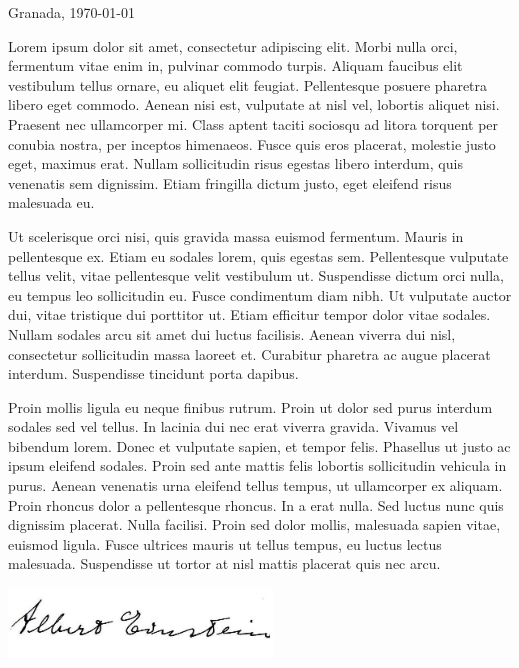 \documentclass[noDatosCabecera, noDatosPie, marcaagua, monocromo]{UGR-carta}
\begin{document}
Granada, \today
\medskip

Lorem ipsum dolor sit amet, consectetur adipiscing elit. Morbi nulla orci, fermentum vitae enim in, pulvinar commodo turpis. Aliquam faucibus elit vestibulum tellus ornare, eu aliquet elit feugiat. Pellentesque posuere pharetra libero eget commodo. Aenean nisi est, vulputate at nisl vel, lobortis aliquet nisi. Praesent nec ullamcorper mi. Class aptent taciti sociosqu ad litora torquent per conubia nostra, per inceptos himenaeos. Fusce quis eros placerat, molestie justo eget, maximus erat. Nullam sollicitudin risus egestas libero interdum, quis venenatis sem dignissim. Etiam fringilla dictum justo, eget eleifend risus malesuada eu.

Ut scelerisque orci nisi, quis gravida massa euismod fermentum. Mauris in pellentesque ex. Etiam eu sodales lorem, quis egestas sem. Pellentesque vulputate tellus velit, vitae pellentesque velit vestibulum ut. Suspendisse dictum orci nulla, eu tempus leo sollicitudin eu. Fusce condimentum diam nibh. Ut vulputate auctor dui, vitae tristique dui porttitor ut. Etiam efficitur tempor dolor vitae sodales. Nullam sodales arcu sit amet dui luctus facilisis. Aenean viverra dui nisl, consectetur sollicitudin massa laoreet et. Curabitur pharetra ac augue placerat interdum. Suspendisse tincidunt porta dapibus.

Proin mollis ligula eu neque finibus rutrum. Proin ut dolor sed purus interdum sodales sed vel tellus. In lacinia dui nec erat viverra gravida. Vivamus vel bibendum lorem. Donec et vulputate sapien, et tempor felis. Phasellus ut justo ac ipsum eleifend sodales. Proin sed ante mattis felis lobortis sollicitudin vehicula in purus. Aenean venenatis urna eleifend tellus tempus, ut ullamcorper ex aliquam. Proin rhoncus dolor a pellentesque rhoncus. In a erat nulla. Sed luctus nunc quis dignissim placerat. Nulla facilisi. Proin sed dolor mollis, malesuada sapien vitae, euismod ligula. Fusce ultrices mauris ut tellus tempus, eu luctus lectus malesuada. Suspendisse ut tortor at nisl mattis placerat quis nec arcu. 

\vfill\vfill
\begin{center}
  \includegraphics[width=7cm]{img/firma}

  \begin{bfseries}
  \printNombre\\\smallskip
  \printCargo
  \end{bfseries}
\end{center}
\vfill
\end{document}

